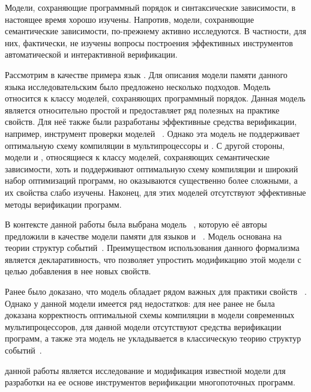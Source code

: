 Модели, сохраняющие программный порядок и синтаксические зависимости, 
в настоящее время хорошо изучены. Напротив, модели, 
сохраняющие семантические зависимости, по-прежнему активно исследуются.
В частности, для них, фактически, не изучены
вопросы построения эффективных инструментов автоматической и интерактивной верификации. 

Рассмотрим в качестве примера язык \CPP.
Для описания модели памяти данного языка исследовательским
 было предложено несколько подходов.
Модель \RCMM~\autocite{Lahav-al:PLDI17}
относится к классу моделей, сохраняющих программный порядок.
Данная модель является относительно простой и
предоставляет ряд  полезных на практике свойств.
Для неё также были разработаны эффективные
средства верификации, например, инструмент проверки моделей \genmc~\autocite{Kokologiannakis:PLDI2019}.
Однако эта модель не поддерживает оптимальную схему компиляции в мультипроцессоры \ARM и \POWER.
С другой стороны, модели \Prm и \Wkm, относящиеся к классу моделей,
сохраняющих семантические зависимости,
хоть и поддерживают оптимальную схему компиляции и широкий набор оптимизаций программ, но оказываются существенно более сложными, а их свойства слабо изучены.
Наконец, для этих моделей отсутствуют эффективные методы верификации программ. 

В контексте данной работы была выбрана модель \Wkm~\autocite{Chakraborty-Vafeiadis:POPL19},
которую её авторы  предложили в качестве модели памяти
для языков \CPP и \LLVM%
~\autocite{Chakraborty-Vafeiadis:CGO17}.
Модель \Wkm основана на теории структур событий~\autocite{Winskel:86,Winskel:ICALP1982}.
Преимуществом использования данного формализма является декларативность, что позволяет упростить  модификацию этой модели
с целью добавления в нее новых свойств.

Ранее было доказано, что модель \Wkm обладает рядом важных для практики свойств%
~\autocite{Chakraborty-Vafeiadis:POPL19}.
Однако у данной модели имеется ряд недостатков:
для нее ранее не была доказана корректность оптимальной схемы
компиляции в модели современных мультипроцессоров,
для данной модели отсутствуют средства верификации программ,
а также эта модель не укладывается в классическую теорию структур событий~\cite{Winskel:86}.

{\aim} данной работы является  исследование и
модификация известной модели \Wkm для разработки
на ее основе инструментов верификации многопоточных программ. 

